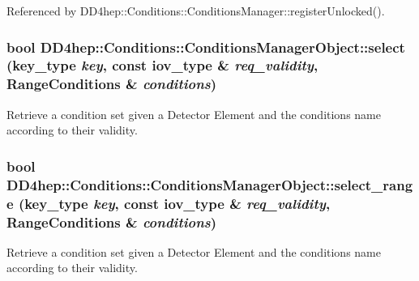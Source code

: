 Referenced by DD4hep::Conditions::ConditionsManager::registerUnlocked().\hypertarget{class_d_d4hep_1_1_conditions_1_1_conditions_manager_object_aa859ab1f2f920ff8b69869d27e3dd8d1}{
\subsubsection[{select}]{\setlength{\rightskip}{0pt plus 5cm}bool DD4hep::Conditions::ConditionsManagerObject::select ({\bf key\_\-type} {\em key}, \/  const {\bf iov\_\-type} \& {\em req\_\-validity}, \/  {\bf RangeConditions} \& {\em conditions})}}
\label{class_d_d4hep_1_1_conditions_1_1_conditions_manager_object_aa859ab1f2f920ff8b69869d27e3dd8d1}


Retrieve a condition set given a Detector Element and the conditions name according to their validity. \hypertarget{class_d_d4hep_1_1_conditions_1_1_conditions_manager_object_a64da19430050ca03c6ee43c83ca68dd9}{
\subsubsection[{select\_\-range}]{\setlength{\rightskip}{0pt plus 5cm}bool DD4hep::Conditions::ConditionsManagerObject::select\_\-range ({\bf key\_\-type} {\em key}, \/  const {\bf iov\_\-type} \& {\em req\_\-validity}, \/  {\bf RangeConditions} \& {\em conditions})}}
\label{class_d_d4hep_1_1_conditions_1_1_conditions_manager_object_a64da19430050ca03c6ee43c83ca68dd9}


Retrieve a condition set given a Detector Element and the conditions name according to their validity. 

